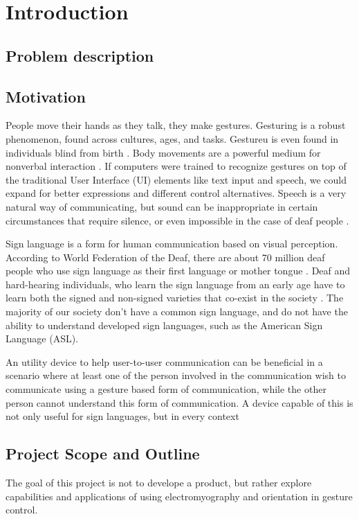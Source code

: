 \chapter{Introduction}
\label{chap:introduction}


\section{Problem description}
\label{sec:problem_description}


\section{Motivation}
\label{sec:motivation}
People move their hands as they talk, they make gestures.  Gesturing is a robust phenomenon, found across cultures, ages, and tasks. Gestureu is even found in individuals blind from birth \cite{goldin1999role}. Body movements are a powerful medium for nonverbal interaction \cite{caramiaux2015understanding}. If computers were trained to recognize gestures on top of the traditional User Interface (UI) elements like text input and speech, we could expand for better expressions and different control alternatives. Speech is a very natural way of communicating, but sound can be inappropriate in certain circumstances that require silence, or even impossible in the case of deaf people \cite{paudyal2016sceptre}. 

Sign language is a form for human communication based on visual perception. According to World Federation of the Deaf, there are about 70 million deaf people who use sign language as their first language or mother tongue \cite{wfdeaf:sign_language}. Deaf and hard-hearing individuals, who learn the sign language from an early age have to learn both the signed and non-signed varieties that co-exist in the society \cite{bidoli2008english}. The majority of our society don't have a common sign language, and do not have the ability to understand developed sign languages, such as the American Sign Language (ASL).

An utility device to help user-to-user communication can be beneficial in a scenario where at least one of the person involved in the communication wish to communicate using a gesture based form of communication, while the other person cannot understand this form of communication. A device capable of this is not only useful for sign languages, but in every context 

\section{Project Scope and Outline}
\label{sec:project_scop_and_outline}
The goal of this project is not to develope a product, but rather explore capabilities and applications of using electromyography and orientation in gesture control.